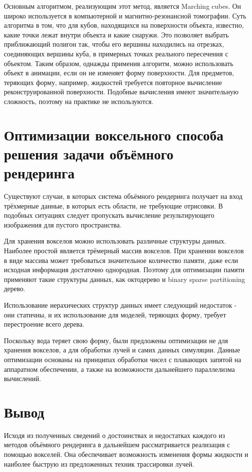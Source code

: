 Основным алгоритмом, реализующим этот метод, является Marching cubes.
Он широко используется в компьютерной и магнитно-резонансной томографии\cite{site:marchingcubes}.
Суть алгоритма в том, что для кубов, находящихся на поверхности объекта, известно,
какие точки лежат внутри объекта и какие снаружи. Это позволяет выбрать
приближающий полигон так, чтобы его вершины находились на отрезках, соединяющих вершины куба,
в примерных точках реального пересечения с объектом.
Таким образом, однажды применив алгоритм, можно использовать объект в анимации, если
он не изменяет форму поверхности.
Для предметов, теряющих форму, например, жидкостей требуется повторное вычисление
реконструированной поверхности. Подобные вычисления имеют значительную сложность,
поэтому на практике не используются\cite{book:ash}.


\section{Оптимизации воксельного способа решения задачи объёмного рендеринга}

Существуют случаи, в которых система объёмного рендеринга получает на вход трёхмерные данные, в
 которых есть области, не требующие отрисовки. В подобных ситуациях следует пропускать вычисление
 результирующего изображения для пустого пространства\cite{article:asvo}.

Для хранения вокселов можно использовать различные структуры данных. Наиболее простой является
трёмерный массив вокселов. При хранении вокселов в виде массива может требоваться значительное
количество памяти, даже если исходная информация достаточно однородная.
Поэтому для оптимизации памяти применяют такие структуры данных, как октодерево и binary sparse
partitioning дерево\cite{article:asvo}.

Использование иерахических структур данных имеет следующий недостаток - они статичны, и их
использование для моделей, теряющих форму, требует перестроение всего дерева\cite{article:asvo}.

Поскольку вода теряет свою форму, были предложены оптимизации не для хранения вокселов, а для
обработки лучей и самих данных симуляции. Данные оптимизации основаны на принципах обработки
чисел с плавающих запятой на аппаратном обеспечении, а также на возможности дальнейшего
параллелизма вычислений\cite{book:ash}.

\section{Вывод}

Исходя из полученных сведений о достоинствах и недостатках каждого из методов объёмного
рендеринга в дальнейшем рассматривается реализация с помощью вокселей. Она обеспечивает
возможность изменения формы жидкости и наиболее быструю из предложенных техник трассировки лучей.

